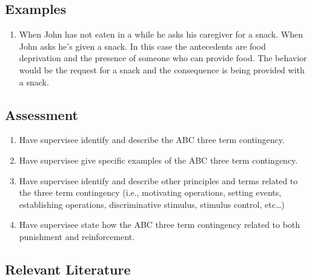 \subsection{Examples}
\begin{enumerate}
\item When John has not eaten in a while he asks his caregiver for a snack. When John asks he's given a snack. In this case the antecedents are food deprivation and the presence of someone who can provide food. The behavior would be the request for a snack and the consequence is being provided with a snack.
%
\end{enumerate}
%
\subsection{Assessment}
\begin{enumerate}
\item Have supervisee identify and describe the ABC three term contingency.
\item Have supervisee give specific examples of the ABC three term contingency.
\item Have supervisee identify and describe other principles and terms related to the three term contingency (i.e., motivating operations, setting events, establishing operations, discriminative stimulus, stimulus control, etc…)
\item Have supervisee state how the ABC three term contingency related to both punishment and reinforcement.
\end{enumerate}
%
\subsection{Relevant Literature}
\begin{refsection}
\nocite{test,alang2017police,clayton2018black}
\printbibliography[heading=none]
\end{refsection}
%

